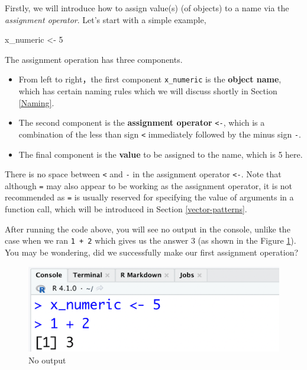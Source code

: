 \documentclass[
]{book}
\newenvironment{Shaded}{\begin{snugshade}}{\end{snugshade}}
\newcommand{\DecValTok}[1]{\textcolor[rgb]{0.00,0.00,0.81}{#1}}
\newcommand{\NormalTok}[1]{#1}
\newcommand{\OtherTok}[1]{\textcolor[rgb]{0.56,0.35,0.01}{#1}}
\providecommand{\tightlist}{%
  \setlength{\itemsep}{0pt}\setlength{\parskip}{0pt}}
\newenvironment{infobox}[1]
  {
  \begin{itemize}
  \renewcommand{\labelitemi}{
    \raisebox{-.7\height}[0pt][0pt]{
      {\setkeys{Gin}{width=3em,keepaspectratio}
        \texttt{[image: pics/\#1]}}
    }
  }
  \setlength{\fboxsep}{1em}
  \begin{blackbox}
  \item
  }
  {
  \end{blackbox}
  \end{itemize}
  }
\newenvironment{blackbox}{
  \definecolor{shadecolor}{rgb}{0, 0, 0}  %
  \color{white}
  \begin{shaded}}
 {\end{shaded}}
\begin{document}
Firstly, we will introduce how to assign value(s) (of objects) to a name via the \emph{assignment operator}. Let's start with a simple example,

\begin{Shaded}
\begin{Highlighting}[]
\NormalTok{x\_numeric }\OtherTok{\textless{}{-}} \DecValTok{5}
\end{Highlighting}
\end{Shaded}

The assignment operation has three components.

\begin{itemize}
\tightlist
\item
  From left to right，the first component \texttt{x\_numeric} is the \textbf{object name}, which has certain naming rules which we will discuss shortly in Section \ref{Naming}.
\item
  The second component is the \textbf{assignment operator} \texttt{\textless{}-}, which is a combination of the less than sign \texttt{\textless{}} immediately followed by the minus sign \texttt{-}.
\item
  The final component is the \textbf{value} to be assigned to the name, which is 5 here.
\end{itemize}

\begin{infobox}{caution}
There is no space between \texttt{\textless{}} and \texttt{-} in the assignment operator \texttt{\textless{}-}. Note that although \texttt{=} may also appear to be working as the assignment operator, it is not recommended as \texttt{=} is usually reserved for specifying the value of arguments in a function call, which will be introduced in Section \ref{vector-patterns}.

\end{infobox}

After running the code above, you will see no output in the console, unlike the case when we ran \texttt{1\ +\ 2} which gives us the answer 3 (as shown in the Figure \ref{fig:noa}). You may be wondering, did we successfully make our first assignment operation?

\begin{figure}

{\centering \includegraphics[width=0.7\linewidth]{pics/2noa} 

}

\caption{No output}\label{fig:noa}
\end{figure}
\end{document}
